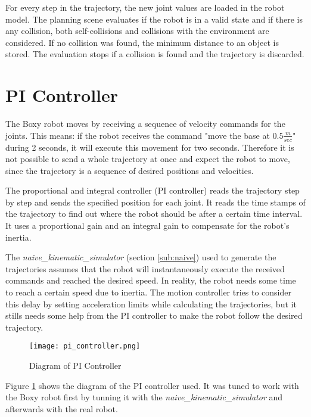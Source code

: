 For every step in the trajectory, the new joint values are loaded in the robot model. The planning scene evaluates if the robot is in a valid state and if there is any collision, both self-collisions and collisions with the environment are considered. If no collision was found, the minimum distance to an object is stored. The evaluation stops if a collision is found and the trajectory is discarded.

\section{PI Controller}
\label{sec:pi_controller}

The Boxy robot moves by receiving a sequence of velocity commands for the joints. This means: if the robot receives the command "move the base at $0.5\frac{m}{sec}$" during 2 seconds, it will execute this movement for two seconds. Therefore it is not possible to send a whole trajectory at once and expect the robot to move, since the trajectory is a sequence of desired positions and velocities.

The proportional and integral controller (PI controller) reads the trajectory step by step and sends the specified position for each joint. It reads the time stamps of the trajectory to find out where the robot should be after a certain time interval. It uses a proportional gain and an integral gain to compensate for the robot's inertia. 

The \textit{naive\_kinematic\_simulator} (section \ref{sub:naive}) used to generate the trajectories assumes that the robot will instantaneously execute the received commands and reached the desired speed. In reality, the robot needs some time to reach a certain speed due to inertia. The motion controller tries to consider this delay by setting acceleration limits while calculating the trajectories, but it stills needs some help from the PI controller to make the robot follow the desired trajectory.

\begin{figure}[H]
	\centering
	\texttt{[image: pi\_controller.png]}
	\vspace{-10pt}
	\caption{Diagram of PI Controller}
	\vspace{-15pt}
	\label{fig:pi}
\end{figure}

Figure \ref{fig:pi} shows the diagram of the PI controller used. It was tuned to work with the Boxy robot first by tunning it with the \textit{naive\_kinematic\_simulator} and afterwards with the real robot.

